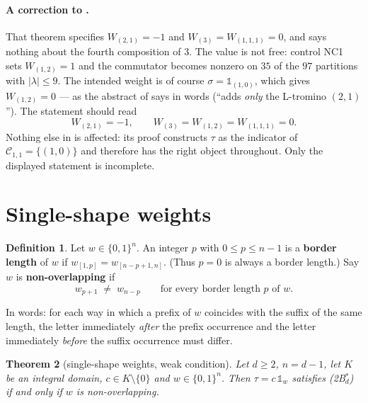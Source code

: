 \documentclass[11pt]{article}
\newtheorem{theorem}{Theorem}[section]
\theoremstyle{definition}
\newtheorem{definition}[theorem]{Definition}
\theoremstyle{remark}
\newcommand{\Cset}{\mathcal{C}}
\newcommand{\one}{\mathbb{1}}
\newcommand{\cube}{\{0,1\}}
\begin{document}
\paragraph{A correction to \cite[Thm.~6.7]{Q150c1}.}  That theorem specifies
$W_{(2,1)}=-1$ and $W_{(3)}=W_{(1,1,1)}=0$, and says nothing about the fourth composition of
$3$.  The value is not free: control NC1 sets $W_{(1,2)}=1$ and the commutator becomes nonzero
on $35$ of the $97$ partitions with $|\lambda|\le9$.  The intended weight is of course
$\sigma=\one_{(1,0)}$, which gives $W_{(1,2)}=0$ --- as the abstract of \cite{Q150c1} says in
words (``adds \emph{only} the L-tromino $(2,1)$'').  The statement should read
\[
  W_{(2,1)}=-1,\qquad W_{(3)}=W_{(1,2)}=W_{(1,1,1)}=0 .
\]
Nothing else in \cite{Q150c1} is affected: its proof constructs $\tau$ as the indicator of
$\Cset_{1,1}=\{(1,0)\}$ and therefore has the right object throughout.  Only the displayed
statement is incomplete.

\section{Single-shape weights}\label{sec:singleton}

\begin{definition}\label{def:border}
Let $w\in\cube^{n}$.  An integer $p$ with $0\le p\le n-1$ is a \textbf{border length} of $w$ if
$w_{[1,p]}=w_{[n-p+1,n]}$.  (Thus $p=0$ is always a border length.)  Say $w$ is
\textbf{non-overlapping} if
\begin{equation}\label{eq:NB}\tag{NB}
   w_{p+1}\;\ne\;w_{n-p}\qquad\text{for every border length }p\text{ of }w .
\end{equation}
\end{definition}

In words: for each way in which a prefix of $w$ coincides with the suffix of the same length,
the letter immediately \emph{after} the prefix occurrence and the letter immediately
\emph{before} the suffix occurrence must differ.

\begin{theorem}[single-shape weights, weak condition]\label{thm:singleton}
Let $d\ge2$, $n=d-1$, let $K$ be an integral domain, $c\in K\setminus\{0\}$ and
$w\in\cube^{n}$.  Then $\tau=c\,\one_{w}$ satisfies \textnormal{(2B$^*_d$)} if and only if $w$
is non-overlapping.
\end{theorem}
\end{document}
